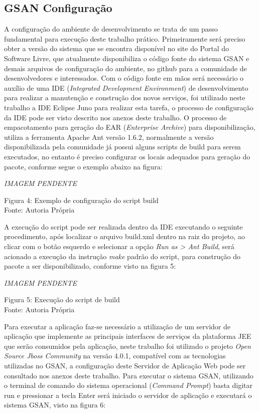 	
\subsection{GSAN Configuração}
A configuração do ambiente de desenvolvimento se trata de um passo fundamental para execução deste trabalho prático. Primeiramente será preciso obter a versão do sistema que se encontra disponível no site do Portal do Software Livre, que atualmente disponibiliza o código fonte do sistema GSAN e demais arquivos de configuração do ambiente, no github para a comunidade de desenvolvedores e interessados.  Com o código fonte em mãos será necessário o auxílio de uma IDE (\textit{Integrated Development Environment}) de desenvolvimento para realizar a manutenção e construção dos novos serviços, foi utilizado neste trabalho a IDE Eclipse Juno para realizar esta tarefa, o processo de configuração da IDE pode ser visto descrito nos anexos deste trabalho.
O processo de empacotamento para geração do EAR (\textit{Enterprise Archive}) para disponibilização, utiliza a ferramenta Apache Ant versão 1.6.2, normalmente a versão disponibilizada pela comunidade já possui alguns scripts de build para serem executados, no entanto é preciso configurar os locais adequados para geração do pacote, conforme segue o exemplo abaixo na figura:

\textit{IMAGEM PENDENTE} \\
\begin{center}
	Figura 4: Exemplo de configuração do script build \\
	Fonte: Autoria Própria
\end{center}
	
A execução do script pode ser realizada dentro da IDE executando o seguinte procedimento, após localizar o arquivo build.xml dentro na raiz do projeto, ao clicar com o botão esquerdo e selecionar a opção \textit{Run as > Ant Build}, será acionado a execução da instrução \textit{make} padrão do script, para construção do pacote a ser disponibilizado, conforme visto na figura 5:	
	
\textit{IMAGEM PENDENTE} \\
\begin{center}
	Figura 5: Execução do script de build  \\
	Fonte: Autoria Própria	
\end{center}	

Para executar a aplicação faz-se necessário a utilização de um servidor de aplicação que implemente as principais interfaces de serviços da plataforma JEE que serão consumidos pela aplicação, neste trabalho foi utilizado o projeto \textit{Open Source Jboss Community} na versão 4.0.1, compatível com as tecnologias utilizadas no GSAN, a configuração deste Servidor de Aplicação Web pode ser consultado nos anexos deste trabalho.
Para executar o sistema GSAN, utilizando o terminal de comando do sistema operacional (\textit{Command Prompt}) basta digitar run e pressionar a tecla Enter será iniciado o servidor de aplicação e executará o sistema GSAN, visto na figura 6:

